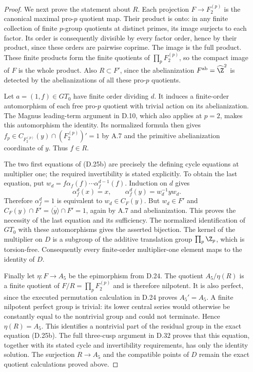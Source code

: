 \begin{proof}
We next prove the statement about $R$. Each projection
$F\to F_2^{(p)}$ is the canonical maximal pro-$p$ quotient
map. Their product is onto: in any finite collection of
finite $p$-group quotients at distinct primes, its image
surjects to each factor. Its order is consequently divisible
by every factor order, hence by their product, since these
orders are pairwise coprime. The image is the full product.
These finite products form the finite quotients of
$\prod_pF_2^{(p)}$, so the compact image of $F$ is the whole
product. Also $R\subset F'$, since the abelianization
$F^{\mathrm{ab}}=\widehat\Z^2$ is detected by the
abelianizations of all these pro-$p$ quotients.

Let $a=(1,f)\in GT_0$ have finite order dividing $d$.
It induces a finite-order automorphism of each free pro-$p$
quotient with trivial action on its abelianization. The
Magnus leading-term argument in D.10, which also applies
at $p=2$, makes this automorphism the identity. Its normalized
formula then gives
$f_p\in C_{F_2^{(p)}}(y)\cap(F_2^{(p)})'=1$ by A.7 and
the primitive abelianization coordinate of $y$.
Thus $f\in R$.

The two first equations of (D.25b) are precisely the defining
cycle equations at multiplier one; the required invertibility
is stated explicitly. To obtain the last equation, put
$w_d=f\alpha_f(f)\cdots\alpha_f^{d-1}(f)$.
Induction on $d$ gives
\[
 \alpha_f^d(x)=x,\qquad
 \alpha_f^d(y)=w_d^{-1}yw_d.
\]
Therefore $\alpha_f^d=1$ is equivalent to
$w_d\in C_F(y)$. But $w_d\in F'$ and
$C_F(y)\cap F'=\overline{\langle y\rangle}\cap F'=1$,
again by A.7 and abelianization. This proves the necessity
of the last equation and its sufficiency. The normalized
identification of $GT_0$ with these automorphisms gives
the asserted bijection. The kernel of the multiplier on
$D$ is a subgroup of the additive translation group
$\prod_p\Z_p$, which is torsion-free. Consequently every
finite-order multiplier-one element maps to the identity
of $D$.

Finally let $\eta:F\to A_5$ be the epimorphism from D.24.
The quotient $A_5/\eta(R)$ is a finite quotient of
$F/R=\prod_pF_2^{(p)}$ and is therefore nilpotent.
It is also perfect, since the executed permutation
calculation in D.24 proves $A_5'=A_5$. A finite nilpotent
perfect group is trivial: its lower central series would
otherwise be constantly equal to the nontrivial group
and could not terminate. Hence $\eta(R)=A_5$.
This identifies a nontrivial part of the residual group in the
exact equation (D.25b). The full three-cusp argument in D.32
proves that this equation, together with its stated cycle and
invertibility requirements, has only the identity solution.
The surjection $R\to A_5$ and the compatible points of $D$
remain the exact quotient calculations proved above.
\end{proof}

